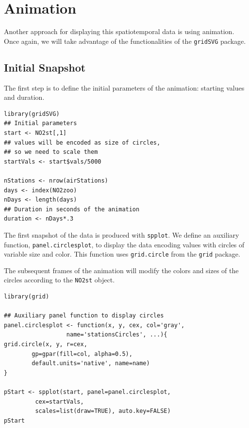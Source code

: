 \documentclass[smallroyalvopaper]{memoir}
\begin{document}
\section{\floweroneleft Animation}
\label{sec-4}
Another approach for displaying this spatiotemporal data is using
animation. Once again, we will take advantage of the functionalities
of the \texttt{gridSVG} package.

\subsection{Initial Snapshot}
\label{sec-4-1}
The first step is to define the initial parameters of the animation:
starting values and duration.


\lstset{language=R,numbers=none}
\begin{lstlisting}
library(gridSVG)
## Initial parameters
start <- NO2st[,1]
## values will be encoded as size of circles,
## so we need to scale them
startVals <- start$vals/5000

nStations <- nrow(airStations)
days <- index(NO2zoo)
nDays <- length(days)
## Duration in seconds of the animation
duration <- nDays*.3
\end{lstlisting}

The first snapshot of the data is produced with \texttt{spplot}. We define an
auxiliary function, \texttt{panel.circlesplot}, to display the data encoding
values with circles of variable size and color.  This function
uses \texttt{grid.circle} from the \texttt{grid} package.  

The subsequent frames of the animation will modify the colors and
sizes of the circles according to the \texttt{NO2st} object.


\lstset{language=R,numbers=none}
\begin{lstlisting}
library(grid)

## Auxiliary panel function to display circles
panel.circlesplot <- function(x, y, cex, col='gray',
			      name='stationsCircles', ...){
grid.circle(x, y, r=cex,
	    gp=gpar(fill=col, alpha=0.5),
	    default.units='native', name=name)
}

pStart <- spplot(start, panel=panel.circlesplot,
		 cex=startVals,
		 scales=list(draw=TRUE), auto.key=FALSE)
pStart
\end{lstlisting}
\end{document}
